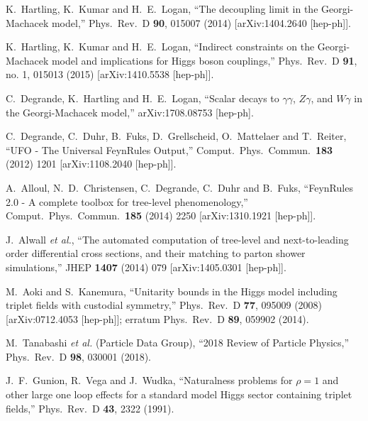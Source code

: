 \documentclass[11pt]{article}
\begin{document}
\begin{thebibliography}{99}
  K.~Hartling, K.~Kumar and H.~E.~Logan,
  ``The decoupling limit in the Georgi-Machacek model,''
  Phys.\ Rev.\ D {\bf 90}, 015007 (2014)
  [arXiv:1404.2640 [hep-ph]].

  K.~Hartling, K.~Kumar and H.~E.~Logan,
  ``Indirect constraints on the Georgi-Machacek model and implications for Higgs boson couplings,''
  Phys.\ Rev.\ D {\bf 91}, no. 1, 015013 (2015)
  [arXiv:1410.5538 [hep-ph]].
  
  C.~Degrande, K.~Hartling and H.~E.~Logan,
  ``Scalar decays to $\gamma\gamma$, $Z\gamma$, and $W\gamma$ in the Georgi-Machacek model,''
  arXiv:1708.08753 [hep-ph].
  
  C.~Degrande, C.~Duhr, B.~Fuks, D.~Grellscheid, O.~Mattelaer and T.~Reiter,
  ``UFO - The Universal FeynRules Output,''
  Comput.\ Phys.\ Commun.\  {\bf 183} (2012) 1201
  [arXiv:1108.2040 [hep-ph]].
  
  A.~Alloul, N.~D.~Christensen, C.~Degrande, C.~Duhr and B.~Fuks,
  ``FeynRules  2.0 - A complete toolbox for tree-level phenomenology,''
  Comput.\ Phys.\ Commun.\  {\bf 185} (2014) 2250
  [arXiv:1310.1921 [hep-ph]].

  J.~Alwall {\it et al.},
  ``The automated computation of tree-level and next-to-leading order differential cross sections, and their matching to parton shower simulations,''
  JHEP {\bf 1407} (2014) 079
  [arXiv:1405.0301 [hep-ph]].


  M.~Aoki and S.~Kanemura,
  ``Unitarity bounds in the Higgs model including triplet fields with custodial symmetry,''  
  Phys.\ Rev.\ D {\bf 77}, 095009 (2008)
  [arXiv:0712.4053 [hep-ph]];   
  erratum Phys.\ Rev.\ D {\bf 89}, 059902 (2014).

M.~Tanabashi {\it et al.} (Particle Data Group),
``2018 Review of Particle Physics,''
Phys.\ Rev.\ D {\bf 98}, 030001 (2018).
  
  J.~F.~Gunion, R.~Vega and J.~Wudka,
  ``Naturalness problems for $\rho = 1$ and other large one loop effects for a standard model Higgs sector containing triplet fields,''
  Phys.\ Rev.\ D {\bf 43}, 2322 (1991).
  

\end{thebibliography}
\end{document}
